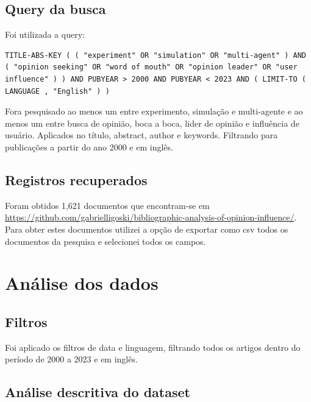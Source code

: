 \subsection{Query da busca}
Foi utilizada a query: 
\begin{verbatim}
TITLE-ABS-KEY ( ( "experiment" OR "simulation" OR "multi-agent" ) AND ( "opinion seeking" OR "word of mouth" OR "opinion leader" OR "user influence" ) ) AND PUBYEAR > 2000 AND PUBYEAR < 2023 AND ( LIMIT-TO ( LANGUAGE , "English" ) )
\end{verbatim}
Fora pesquisado ao menos um entre experimento, simulação e multi-agente e ao menos um entre busca de opinião, boca a boca, lider de opinião e influência de usuário. Aplicados no título, abstract, author e keywords. Filtrando para publicações a partir do ano 2000 e em inglês.

\subsection{Registros recuperados}
Foram obtidos 1,621 documentos que encontram-se em \url{https://github.com/gabrielligoski/bibliographic-analysis-of-opinion-influence/}.
Para obter estes documentos utilizei a opção de exportar como csv todos os documentos da pesquisa e selecionei todos os campos.

\section{Análise dos dados}
\subsection{Filtros}
Foi aplicado os filtros de data e linguagem, filtrando todos os artigos dentro do período de 2000 a 2023 e em inglês.

\subsection{Análise descritiva do dataset}

